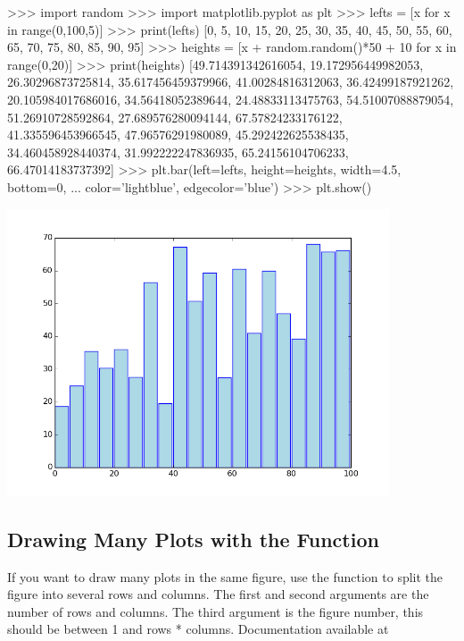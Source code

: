 \documentclass[11pt]{cselabheader}
\begin{document}
\begin{pyconcode}
>>> import random
>>> import matplotlib.pyplot as plt
>>> lefts = [x for x in range(0,100,5)]
>>> print(lefts)
[0, 5, 10, 15, 20, 25, 30, 35, 40, 45, 50, 55, 60, 65, 70, 75, 80, 85, 90, 95]
>>> heights = [x + random.random()*50 + 10 for x in range(0,20)]
>>> print(heights)
[49.714391342616054, 19.172956449982053, 26.30296873725814, 35.617456459379966,
 41.00284816312063, 36.42499187921262, 20.105984017686016, 34.56418052389644,
 24.48833113475763, 54.51007088879054, 51.26910728592864, 27.689576280094144,
 67.57824233176122, 41.335596453966545, 47.96576291980089, 45.292422625538435,
 34.460458928440374, 31.992222247836935, 65.24156104706233, 66.47014183737392]
>>> plt.bar(left=lefts, height=heights, width=4.5, bottom=0,
...         color='lightblue', edgecolor='blue')
>>> plt.show()
\end{pyconcode}

\begin{center}
\includegraphics[width=0.85\textwidth]{img/matplotlib_bar.png}
\end{center}

\subsection{Drawing Many Plots with the 
Function}

If you want to draw many plots in the same figure, use the
 function to split the figure into several rows
and columns. The first and second arguments are the number of rows and columns.
The third argument is the figure number, this should be between 1 and
rows * columns. Documentation available at
\end{document}
